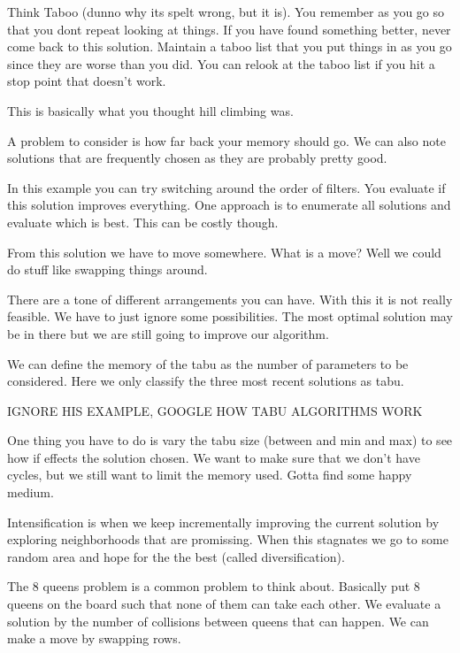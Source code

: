 \documentclass[12pt]{article}
\begin{document}
 
Think Taboo (dunno why its spelt wrong, but it is). You remember as you go so that you dont repeat looking at things. If you have found something better, never come back to this solution. Maintain a taboo list that you put things in as you go since they are worse than you did. You can relook at the taboo list if you hit a stop point that doesn't work.

 
This is basically what you thought hill climbing was.

 
A problem to consider is how far back your memory should go. We can also note solutions that are frequently chosen as they are probably pretty good.

 
In this example you can try switching around the order of filters. You evaluate if this solution improves everything. One approach is to enumerate all solutions and evaluate which is best. This can be costly though. 

 
From this solution we have to move somewhere. What is a move? Well we could do stuff like swapping things around. 

 
There are a tone of different arrangements you can have. With this it is not really feasible. We have to just ignore some possibilities. The most optimal solution may be in there but we are still going to improve our algorithm.

 
We can define the memory of the tabu as the number of parameters to be considered. Here we only classify the three most recent solutions as tabu.


IGNORE HIS EXAMPLE, GOOGLE HOW TABU ALGORITHMS WORK

 
One thing you have to do is vary the tabu size (between and min and max) to see how if effects the solution chosen. We want to make sure that we don't have cycles, but we still want to limit the memory used. Gotta find some happy medium.

 
Intensification is when we keep incrementally improving the current solution by exploring neighborhoods that are promissing. When this stagnates we go to some random area and hope for the the best (called diversification).

 
The 8 queens problem is a common problem to think about. Basically put 8 queens on the board such that none of them can take each other. We evaluate a solution by the number of collisions between queens that can happen. We can make a move by swapping rows.
\end{document}
